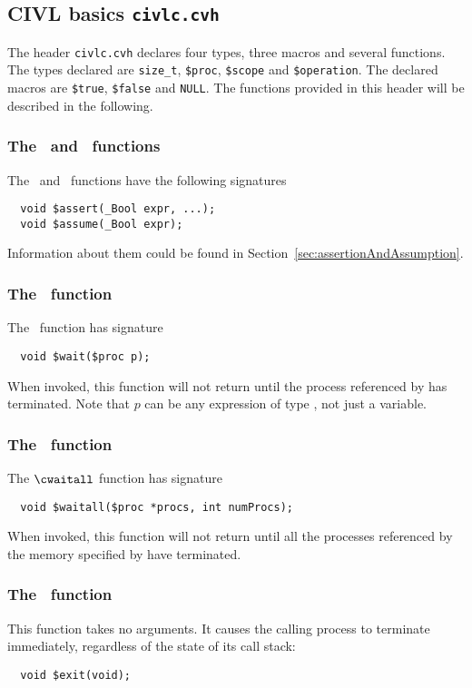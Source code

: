 \subsection{CIVL basics \texttt{civlc.cvh}}
\label{subsec:civlcLibrary}
The header \texttt{civlc.cvh} declares four types, three macros and  several functions. The types declared are \texttt{size\_t}, \texttt{\$proc},
\texttt{\$scope} and \texttt{\$operation}. The declared macros are \texttt{\$true}, \texttt{\$false} and \texttt{NULL}. The functions provided in this header
will be described in the following.

\subsubsection{The \cassert\ and \cassume\ functions}
\label{subsubsec:wait}
The \cassert\ and \cassume \ functions have the following signatures
\begin{verbatim}
  void $assert(_Bool expr, ...);
  void $assume(_Bool expr);
\end{verbatim}

Information about them could be found in Section~\ref{sec:assertionAndAssumption}.

\subsubsection{The \cwait\ function}
\label{subsubsec:wait}
The \cwait\ function has signature
\begin{verbatim}
  void $wait($proc p);
\end{verbatim}

When invoked, this function will not return until the process
referenced by  has terminated. Note that $p$ can be any
expression of type \cproc{}, not just a variable.

\subsubsection{The \cwaitall\ function}
\label{subsubsec:waitall}
The $\cwaitall$ function has signature
\begin{verbatim}
  void $waitall($proc *procs, int numProcs);
\end{verbatim}
When invoked, this function will not return until all the  processes
referenced by the memory specified by  have terminated.

\subsubsection{The \cexit\ function}
\label{subsubsec:exit}
This function takes no arguments.  It causes the
calling process to terminate immediately, regardless of the state of
its call stack:
\begin{verbatim}
  void $exit(void);
\end{verbatim}

